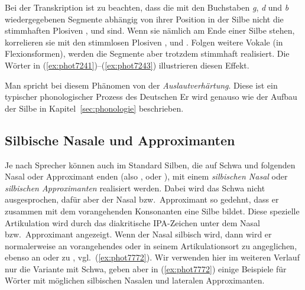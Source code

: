 \label{sec:auslautverhaertungphonetik}


Bei der Transkription ist zu beachten, dass die mit den Buchstaben \textit{g}, \textit{d} und \textit{b} wiedergegebenen Segmente abhängig von ihrer Position in der Silbe nicht die stimmhaften Plosiven \textipa{[g]}, \textipa{[d]} und \textipa{[b]} sind.
Wenn sie nämlich am Ende einer Silbe stehen, korrelieren sie mit den stimmlosen Plosiven \textipa{[k]}, \textipa{[t]} und \textipa{[p]}.
Folgen weitere Vokale (\zB in Flexionsformen), werden die Segmente aber trotzdem stimmhaft realisiert.
Die Wörter in (\ref{ex:phot7241})--(\ref{ex:phot7243}) illustrieren diesen Effekt.

\begin{exe}
  \ex\label{ex:phot7241}
  \begin{xlist}
  \end{xlist}
  \ex\label{ex:phot7242}
  \begin{xlist}
  \end{xlist}
  \ex\label{ex:phot7243}
  \begin{xlist}
  \end{xlist}
\end{exe}

Man spricht bei diesem Phänomen von der \textit{Auslautverhärtung}.
Diese ist ein typischer phonologischer Prozess des Deutschen
Er wird genauso wie der Aufbau der Silbe in Kapitel~\ref{sec:phonologie} beschrieben.

\subsection{Silbische Nasale und Approximanten}

\label{sec:silbischenasaleapproximanten}

Je nach Sprecher können auch im Standard Silben, die auf Schwa und folgenden Nasal oder Approximant enden (also \textipa{[@n]}, \textipa{[@m]} oder \textipa{[@l]}), mit einem \textit{silbischen Nasal} oder \textit{silbischen Approximanten} realisiert werden.
Dabei wird das Schwa nicht ausgesprochen, dafür aber der Nasal bzw.\ Approximant so gedehnt, dass er zusammen mit dem vorangehenden Konsonanten eine Silbe bildet.
Diese spezielle Artikulation wird durch das diakritische IPA-Zeichen \textipa{[\s{ }]} unter dem Nasal bzw.\ Approximant angezeigt.
Wenn der Nasal \textipa{[n]} silbisch wird, dann wird er normalerweise an vorangehendes \textipa{[b]} oder \textipa{[p]} in seinem Artikulationsort zu \textipa{[m]} angeglichen, ebenso an \textipa{[g]} oder \textipa{[k]} zu \textipa{[N]}, vgl.\ (\ref{ex:phot7772}).
Wir verwenden hier im weiteren Verlauf nur die Variante mit Schwa, geben aber in (\ref{ex:phot7772}) einige Beispiele für Wörter mit möglichen silbischen Nasalen und lateralen Approximanten.


